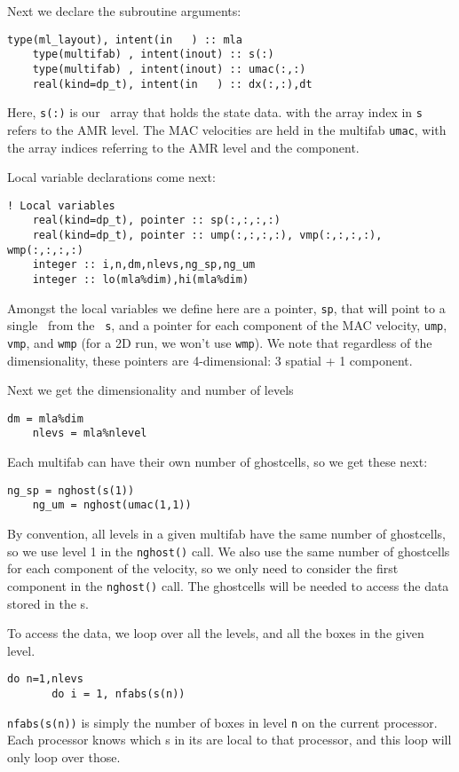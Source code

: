 Next we declare the subroutine arguments:

\begin{lstlisting}[language={[95]fortran},mathescape=false]
    type(ml_layout), intent(in   ) :: mla
    type(multifab) , intent(inout) :: s(:)
    type(multifab) , intent(inout) :: umac(:,:)
    real(kind=dp_t), intent(in   ) :: dx(:,:),dt
\end{lstlisting}
Here, {\tt s(:)} is our \multifab\ array that holds the state data.
with the array index in {\tt s} refers to the AMR level.  The MAC 
velocities are held in the multifab {\tt umac}, with the array
indices referring to the AMR level and the component.


Local variable declarations come next:
\begin{lstlisting}[language={[95]fortran},mathescape=false]
    ! Local variables
    real(kind=dp_t), pointer :: sp(:,:,:,:)
    real(kind=dp_t), pointer :: ump(:,:,:,:), vmp(:,:,:,:), wmp(:,:,:,:)
    integer :: i,n,dm,nlevs,ng_sp,ng_um
    integer :: lo(mla%dim),hi(mla%dim)
\end{lstlisting}

\noindent Amongst the local variables we define here are a pointer,
{\tt sp}, that will point to a single \fab\ from the
\multifab\ {\tt s}, and a pointer for each component of the MAC
velocity, {\tt ump}, {\tt vmp}, and {\tt wmp} (for a 2D run,
we won't use {\tt wmp}).  We note that regardless of the dimensionality,
these pointers are 4-dimensional: 3 spatial + 1 component.

Next we get the dimensionality and number of levels
\begin{lstlisting}[language={[95]fortran},mathescape=false]
    dm = mla%dim
    nlevs = mla%nlevel
\end{lstlisting}


Each multifab can have their own number of ghostcells, so we get
these next:
\begin{lstlisting}[language={[95]fortran},mathescape=false]
    ng_sp = nghost(s(1))
    ng_um = nghost(umac(1,1))
\end{lstlisting}
By convention, all levels in a given multifab have the same number of
ghostcells, so we use level 1 in the {\tt nghost()} call.  We also use
the same number of ghostcells for each component of the velocity, so
we only need to consider the first component in the {\tt nghost()}
call.  The ghostcells will be needed to access the data stored in the
\fab s.

To access the data, we loop over all the levels, and all the boxes in
the given level.
\begin{lstlisting}[language={[95]fortran},mathescape=false]
    do n=1,nlevs
       do i = 1, nfabs(s(n))
\end{lstlisting}
{\tt nfabs(s(n))} is simply the number of boxes in level {\tt n} on
the current processor.  Each processor knows which \fab s in its
\multifab are local to that processor, and this loop will only loop
over those.

